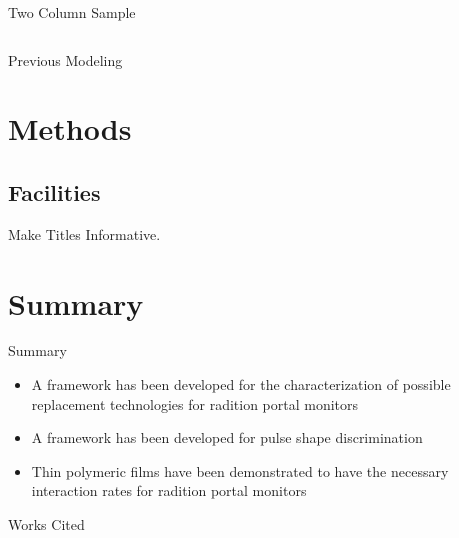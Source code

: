 \documentclass{beamer}
\begin{document}
\begin{frame}{Two Column Sample}
\begin{columns}[onlytextwidth]
\begin{column}[0.45\textwidth]

\end{column}
\begin{column}[0.45\textwidth]

\end{column}
\end{columns}
\end{frame}
\begin{frame}{Previous Modeling}
\end{frame}



\section{Methods}

\subsection{Facilities}

\begin{frame}{Make Titles Informative.}
\end{frame}


\section*{Summary}

\begin{frame}{Summary}

  \begin{itemize}
  \item
    A framework has been developed for the characterization of possible replacement technologies for radition portal monitors
  \item
    A framework has been developed for pulse shape discrimination 
  \item
    Thin polymeric films have been demonstrated to have the necessary interaction rates for radition portal monitors
  \end{itemize}
  
\end{frame}


\begin{frame}{Works Cited}
	
\end{frame}
\end{document}
